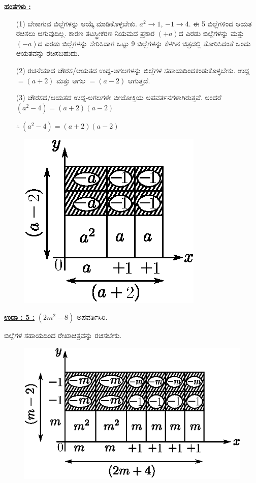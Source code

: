 \noindent
{\textbf{\underline{ಹಂತಗಳು :}}}
\begin{itemize}
\item [(1)] ಬೇಕಾಗುವ ಬಿಲ್ಲೆಗಳನ್ನು ಆಯ್ಕೆ ಮಾಡಿಕೊಳ್ಳಬೇಕು. $a^2 \rightarrow 1$, $-1 \rightarrow 4$. ಈ 5 ಬಿಲ್ಲೆಗಳಿಂದ ಆಯತ ರಚಿಸಲು ಆಗುವುದಿಲ್ಲ. ಕಾರಣ ತಟಸ್ಥೀಕರಣ ನಿಯಮದ ಪ್ರಕಾರ $(+a)$ದ ಎರಡು ಬಿಲ್ಲೆಗಳನ್ನು ಮತ್ತು $(-a)$ದ ಎರಡು ಬಿಲ್ಲೆಗಳನ್ನು ಸೇರಿಸಿದಾಗ ಒಟ್ಟು 9 ಬಿಲ್ಲೆಗಳನ್ನು ಕೆಳಗಿನ ಚಿತ್ರದಲ್ಲಿ ತೋರಿಸಿದಂತೆ ಒಂದು ಆಯತವನ್ನು ರಚಿಸಬಹುದು. 
\item [(2)] ರಚನೆಯಾದ ಚೌರಸ/ಆಯತದ ಉದ್ದ-ಅಗಲಗಳನ್ನು ಬಿಲ್ಲೆಗಳ ಸಹಾಯದಿಂದ\break ಕಂಡುಕೊಳ್ಳಬೇಕು. ಉದ್ದ $= (a+2)$ ಮತ್ತು ಅಗಲ $= (a-2)$ ಆಗುತ್ತದೆ.
\item [(3)] ಚೌರಸದ/ಆಯತದ ಉದ್ದ-ಅಗಲಗಳೇ ಬೀಜೋಕ್ತಿಯ ಅಪವರ್ತನಗಳಾಗಿರುತ್ತವೆ. ಅಂದರೆ $(a^2 - 4) = (a+2)(a-2)$

$\therefore \ (a^{2}-4)=(a+2)(a-2)$
\end{itemize}
\begin{figure}[H]
\centering
\includegraphics[scale=0.9]{src/figure/chap3/fig3-37b.eps}
\end{figure}

\noindent
{\textbf{\underline{ಉದಾ : 5 :}}} $(2m^2 - 8)$ ಅಪವರ್ತಿಸಿರಿ. 

ಬಿಲ್ಲೆಗಳ ಸಹಾಯದಿಂದ ರೇಖಾಚಿತ್ರವನ್ನು ರಚಿಸಬೇಕು.
\begin{figure}[H]
\centering
\includegraphics[scale=0.8]{src/figure/chap3/fig3-38b.eps}
\end{figure}

